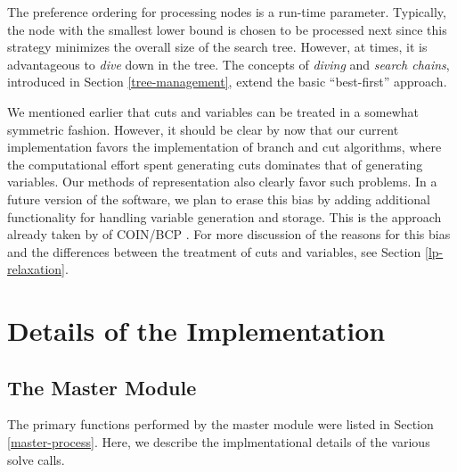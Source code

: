 The preference ordering for processing nodes is a run-time parameter.
Typically, the node with the smallest lower bound is chosen to be
processed next since this strategy minimizes the overall size of the
search tree. However, at times, it is advantageous to {\em dive}
down in the tree. The concepts of {\em diving} and {\em search
chains}, introduced in Section \ref{tree-management}, extend the basic
``best-first'' approach.

We mentioned earlier that cuts and variables can be treated in a
somewhat symmetric fashion. However, it should be clear by now
that our current implementation favors the implementation of
branch and cut algorithms, where the computational effort spent
generating cuts dominates that of generating variables. Our methods of
representation also clearly favor such problems. In a future version
of the software, we plan to erase this bias by adding additional
functionality for handling variable generation and storage. This is
the approach already taken by of COIN/BCP \cite{coin-or}. For more
discussion of the reasons for this bias and the differences between
the treatment of cuts and variables, see Section \ref{lp-relaxation}.

\section{Details of the Implementation}
\label{modules}

\subsection{The Master Module}
\label{master}

The primary functions performed by the master module were listed in
Section \ref{master-process}. Here, we describe the implmentational details of
the various solve calls.  

